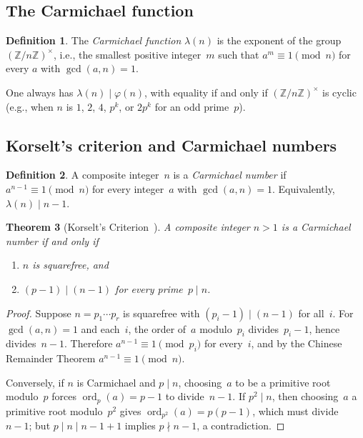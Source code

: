 \documentclass[12pt]{amsart}
\theoremstyle{plain}
\newtheorem{theorem}{Theorem}[section]
\theoremstyle{definition}
\newtheorem{definition}[theorem]{Definition}
\theoremstyle{remark}
\DeclareMathOperator{\ord}{ord}
\newcommand{\Z}{\mathbb{Z}}
\begin{document}
\subsection{The Carmichael function}

\begin{definition}\label{def:carmichael_lambda}
The \emph{Carmichael function} $\lambda(n)$ is the exponent of the
group~$(\Z/n\Z)^{\times}$, i.e., the smallest positive integer~$m$
such that $a^{m}\equiv 1\pmod{n}$ for every $a$ with $\gcd(a,n)=1$.
\end{definition}

One always has $\lambda(n)\mid\varphi(n)$, with equality if and only
if $(\Z/n\Z)^{\times}$ is cyclic (e.g., when $n$ is $1$, $2$, $4$,
$p^{k}$, or $2p^{k}$ for an odd prime~$p$).

\subsection{Korselt's criterion and Carmichael numbers}

\begin{definition}\label{def:carmichael}
A composite integer~$n$ is a \emph{Carmichael number} if
$a^{n-1}\equiv 1\pmod{n}$ for every integer~$a$ with $\gcd(a,n)=1$.
Equivalently, $\lambda(n)\mid n-1$.
\end{definition}

\begin{theorem}[Korselt's Criterion~\cite{korselt1899}]
\label{thm:korselt}
A composite integer $n>1$ is a Carmichael number if and only if
\begin{enumerate}
\item[\textup{(i)}] $n$ is squarefree, and
\item[\textup{(ii)}] $(p-1)\mid(n-1)$ for every prime~$p\mid n$.
\end{enumerate}
\end{theorem}

\begin{proof}
Suppose $n=p_1\cdots p_r$ is squarefree with $(p_i-1)\mid(n-1)$ for
all~$i$.  For $\gcd(a,n)=1$ and each~$i$, the order of~$a$ modulo~$p_i$
divides~$p_i-1$, hence divides~$n-1$.  Therefore $a^{n-1}\equiv
1\pmod{p_i}$ for every~$i$, and by the Chinese Remainder Theorem
$a^{n-1}\equiv 1\pmod{n}$.

Conversely, if $n$ is Carmichael and $p\mid n$, choosing~$a$ to be a
primitive root modulo~$p$ forces $\ord_{p}(a)=p-1$ to divide~$n-1$.
If $p^{2}\mid n$, then choosing~$a$ a primitive root modulo~$p^{2}$
gives $\ord_{p^2}(a)=p(p-1)$, which must divide~$n-1$; but
$p\mid n\mid n-1+1$ implies $p\nmid n-1$, a contradiction.
\end{proof}
\end{document}

